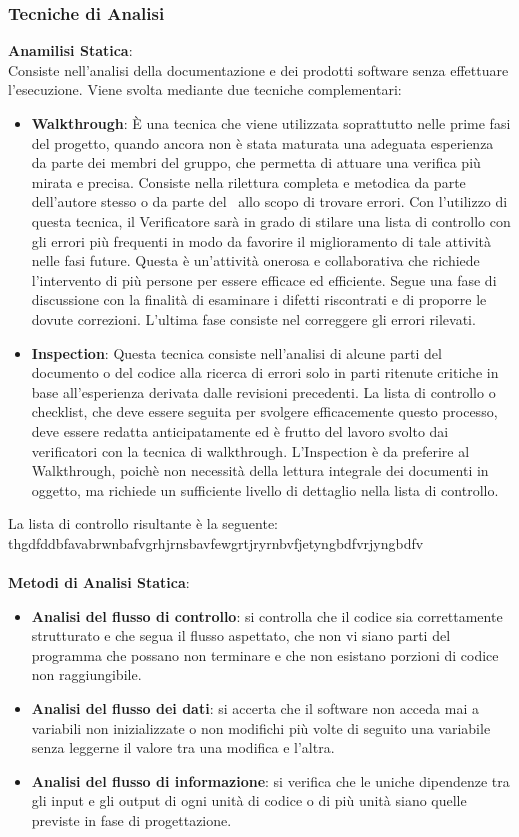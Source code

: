 \subsubsection{Tecniche di Analisi}
\textbf{Anamilisi Statica}:\medskip \\ 
Consiste nell'analisi della documentazione e dei prodotti software senza effettuare l'esecuzione. Viene svolta mediante due tecniche complementari:
\begin{itemize}
	\item \textbf{Walkthrough}:
	È una tecnica che viene utilizzata soprattutto nelle prime fasi del progetto, quando ancora non è stata maturata una adeguata esperienza da parte dei membri del gruppo, che permetta di attuare una verifica più mirata e precisa. Consiste nella rilettura completa e metodica da
	parte dell'autore stesso o da parte del \ruoloVerificatore\ allo scopo di trovare errori. Con l'utilizzo di questa tecnica, il Verificatore sarà in grado di stilare una lista di controllo con gli errori più frequenti in modo da favorire il miglioramento di tale attività nelle fasi future. Questa è un'attività onerosa e collaborativa che richiede l'intervento di più persone per essere efficace ed efficiente. Segue una fase di discussione con la finalità di esaminare i difetti riscontrati e di proporre le dovute correzioni. L'ultima fase consiste nel correggere gli errori rilevati.
	
	\item \textbf{Inspection}:
	Questa tecnica consiste nell'analisi di alcune parti del documento o del codice alla ricerca di errori solo in parti ritenute critiche in base all'esperienza derivata dalle revisioni precedenti. La lista di controllo o checklist, che deve essere seguita per svolgere efficacemente questo processo, deve essere redatta anticipatamente ed è frutto del lavoro svolto dai verificatori con la tecnica di walkthrough. L'Inspection è da preferire al Walkthrough, poichè  non necessità della lettura integrale dei documenti in oggetto, ma richiede un sufficiente livello di dettaglio nella lista di controllo.	    
\end{itemize}
La lista di controllo risultante è la seguente:
thgdfddbfavabrwnbafvgrhjrnsbavfewgrtjryrnbvfjetyngbdfvrjyngbdfv \\ \\
\textbf{Metodi di Analisi Statica}:
\begin{itemize}
	\item \textbf{Analisi del flusso di controllo}: si controlla che il codice sia correttamente strutturato e che segua il flusso aspettato, che non vi siano parti del programma che possano non terminare e che non esistano porzioni di codice non raggiungibile.
	\item \textbf{Analisi del flusso dei dati}: si accerta che il software non acceda mai a variabili non inizializzate o non modifichi più volte di seguito una variabile senza leggerne il valore tra una modifica e l'altra.
	\item \textbf{Analisi del flusso di informazione}: si verifica che le uniche dipendenze tra gli input e gli output di ogni unità di codice o di più unità siano quelle previste in fase di progettazione.
\end{itemize}
